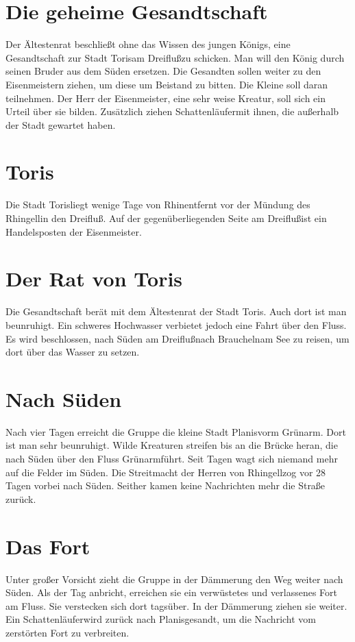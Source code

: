 \documentclass[12pt,a4paper,onecolumn,twoside,ngerman]{book}
\newcommand{\Schattenlaufer}{Schattenläufer}
\newcommand{\Rhingell}{Rhingell}
\newcommand{\Rhin}{Rhin}
\newcommand{\Dreifluss}{Dreifluß}
\newcommand{\Toris}{Toris}
\newcommand{\Planis}{Planis}
\newcommand{\Grunarm}{Grünarm}
\newcommand{\Grunland}{Grünland}
\newcommand{\Braucheln}{Braucheln}
\newcommand{\Eisenmeister}{Eisenmeister}
\begin{document}
\section{Die geheime Gesandtschaft}
Der Ältestenrat beschließt ohne das Wissen des jungen Königs, eine Gesandtschaft zur Stadt \Toris am \Dreifluss zu schicken. Man will den König durch seinen Bruder aus dem Süden ersetzen. Die Gesandten sollen weiter zu den \Eisenmeister{n} ziehen, um diese um Beistand zu bitten. Die Kleine soll daran teilnehmen. Der Herr der \Eisenmeister, eine sehr weise Kreatur, soll sich ein Urteil über sie bilden. Zusätzlich ziehen \Schattenlaufer mit ihnen, die außerhalb der Stadt gewartet haben.

\section{\Toris}
Die Stadt \Toris liegt wenige Tage von \Rhin entfernt vor der Mündung des \Rhingell in den \Dreifluss. Auf der gegenüberliegenden Seite am \Dreifluss ist ein Handelsposten der \Eisenmeister.

\section{Der Rat von \Toris}
Die Gesandtschaft berät mit dem Ältestenrat der Stadt \Toris. Auch dort ist man beunruhigt. Ein schweres Hochwasser verbietet jedoch eine Fahrt über den Fluss. Es wird beschlossen, nach Süden am \Dreifluss nach \Braucheln am See zu reisen, um dort über das Wasser zu setzen.

\section{Nach Süden}
Nach vier Tagen erreicht die Gruppe die kleine Stadt \Planis vorm \Grunarm. Dort ist man sehr beunruhigt. Wilde Kreaturen streifen bis an die Brücke heran, die nach Süden über den Fluss \Grunarm führt. Seit Tagen wagt sich niemand mehr auf die Felder im Süden. Die Streitmacht der Herren von \Rhingell zog vor 28 Tagen vorbei nach Süden. Seither kamen keine Nachrichten mehr die Straße zurück.
 
\section{Das Fort}
Unter großer Vorsicht zieht die Gruppe in der Dämmerung den Weg weiter nach Süden. Als der Tag anbricht, erreichen sie ein verwüstetes und verlassenes Fort am Fluss. Sie verstecken sich dort tagsüber. In der Dämmerung ziehen sie weiter. Ein \Schattenlaufer wird zurück nach \Planis gesandt, um die Nachricht vom zerstörten Fort zu verbreiten.
\end{document}
